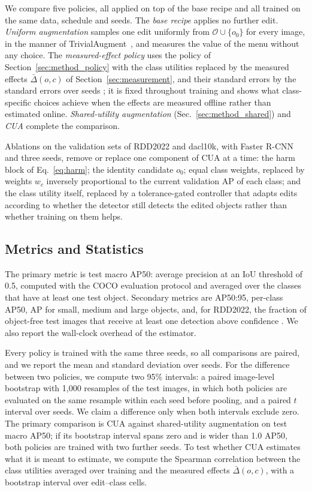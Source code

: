We compare five policies, all applied on top of the base recipe and all trained on the same data, schedule and seeds. The \emph{base recipe} applies no further edit. \emph{Uniform augmentation} samples one edit uniformly from $\mathcal{O}\cup\{o_0\}$ for every image, in the manner of TrivialAugment~\cite{muller2021trivial}, and measures the value of the menu without any choice. The \emph{measured-effect policy} uses the policy of Section~\ref{sec:method_policy} with the class utilities replaced by the measured effects $\bar\Delta(o,c)$ of Section~\ref{sec:measurement}, and their standard errors by the standard errors over seeds ; it is fixed throughout training and shows what class-specific choices achieve when the effects are measured offline rather than estimated online. \emph{Shared-utility augmentation} (Sec.~\ref{sec:method_shared}) and \emph{CUA} complete the comparison.

Ablations on the validation sets of RDD2022 and dacl10k, with Faster R-CNN and three seeds, remove or replace one component of CUA at a time: the harm block of Eq.~\eqref{eq:harm}; the identity candidate $o_0$; equal class weights, replaced by weights $w_c$ inversely proportional to the current validation AP of each class; and the class utility itself, replaced by a tolerance-gated controller that adapts edits according to whether the detector still detects the edited objects rather than whether training on them helps. 

\subsection{Metrics and Statistics}
\label{sec:setup_metrics}

The primary metric is test macro AP50: average precision at an IoU threshold of 0.5, computed with the COCO evaluation protocol and averaged over the classes that have at least one test object. Secondary metrics are AP50:95, per-class AP50, AP for small, medium and large objects, and, for RDD2022, the fraction of object-free test images that receive at least one detection above confidence . We also report the wall-clock overhead of the estimator.

Every policy is trained with the same three seeds, so all comparisons are paired, and we report the mean and standard deviation over seeds. For the difference between two policies, we compute two 95\% intervals: a paired image-level bootstrap with 1,000 resamples of the test images, in which both policies are evaluated on the same resample within each seed before pooling, and a paired $t$ interval over seeds. We claim a difference only when both intervals exclude zero. The primary comparison is CUA against shared-utility augmentation on test macro AP50; if its bootstrap interval spans zero and is wider than 1.0 AP50, both policies are trained with two further seeds. To test whether CUA estimates what it is meant to estimate, we compute the Spearman correlation between the class utilities averaged over training and the measured effects $\bar\Delta(o,c)$, with a bootstrap interval over edit--class cells.

